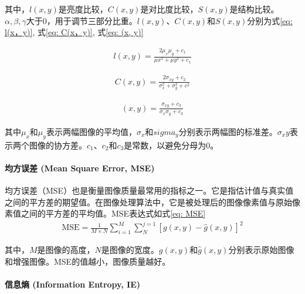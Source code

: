 \documentclass[a4paper]{ctexart}
\begin{document}
	其中，$l(x,y)$是亮度比较，$C(x,y)$是对比度比较，$S(x,y)$是结构比较。$\alpha, \beta, \gamma$大于$0$，用于调节三部分比重。$l(x, y)$、$C(x, y)$和$S(x, y)$分别为式\ref{eq: l(x，y)}, 式\ref{eq: C(x，y)}, 式\ref{eq: (x, y)}
	
	\begin{equation}
		\begin{aligned}
			l(x,y)=\frac{2\mu_x \mu_y + c_1}{\mu x^2 + \mu y^2 + c_1}
		\end{aligned}
		\label{eq: l(x，y)}
	\end{equation}
	
	\begin{equation}
		\begin{aligned}
			C(x,y) = \frac{2\sigma_{xy}+c_2}{\sigma_x^2 + \sigma_ y^2 + c^2}
		\end{aligned}
		\label{eq: C(x，y)}
	\end{equation}
	
	\begin{equation}
		\begin{aligned}
			(x, y) = \frac{\sigma_{xy} + c_3}{\sigma_{x}\sigma_{y} + c_3}
		\end{aligned}
		\label{eq: (x, y)}
	\end{equation}
	
	其中$\mu_x$和$\mu_y$表示两幅图像的平均值，$\sigma_x$和$sigma_y$分别表示两幅图的标准差。$\sigma_xy$表示两个图像的协方差。$c_1$、$c_2$和$c_3$是常数，以避免分母为0。
	
	\paragraph{均方误差 (Mean Square Error, MSE)}
	
	均方误差（MSE）也是衡量图像质量最常用的指标之一。它是指估计值与真实值之间的平方差的期望值。在图像处理算法中，它是被处理后的图像像素值与原始像素值之间的平方差的平均值。MSE表达式如式\ref{eq: MSE}
	\begin{equation}
		\begin{aligned}
			\text{MSE} = \frac{1}{M \times N} \sum_{i=1}^{M} \sum_{N}^{j=1}{\left[ g(x,y) - \hat{g}(x,y) \right]}^2
		\end{aligned}
		\label{eq: MSE}
	\end{equation}
	
	其中，$M$是图像的高度，$N$是图像的宽度。$g(x,y)$和$\hat{g}(x,y)$分别表示原始图像和增强图像。MSE的值越小，图像质量越好。
	
	
	\paragraph{信息熵 (Information Entropy, IE)}
	
\end{document}
